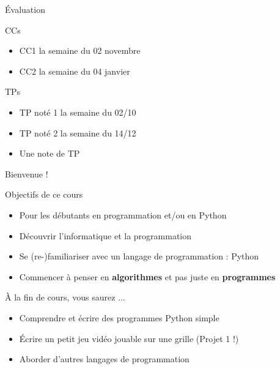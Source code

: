 \documentclass{beamer}
\begin{document}
\begin{frame}{Évaluation}

  \begin{block}{CCs}
    \begin{itemize}
    \item CC1 la semaine du 02 novembre 
    \item CC2 la semaine du 04 janvier 
    \end{itemize}
  \end{block}
  \begin{block}{TPs}
    \begin{itemize}
    \item TP noté 1 la semaine du 02/10
    \item TP noté 2 la semaine du 14/12
    \item Une note de TP
    \end{itemize}
  \end{block}


\end{frame}

\begin{frame}{Bienvenue !}
    \begin{block}{Objectifs de ce cours}
    \begin{itemize}
 		\item Pour les débutants en programmation et/ou en Python
        \item Découvrir l'informatique et la programmation
        \item Se (re-)familiariser avec un langage de programmation : Python
        \item Commencer à penser en \textbf{algorithmes} et pas juste en \textbf{programmes}
    \end{itemize}
    \end{block}
    \pause
    \vfill
    \begin{block}{À la fin de cours, vous saurez ...}
        \begin{itemize}
            \item Comprendre et écrire des programmes Python simple
            \item Écrire un petit jeu vidéo jouable sur une grille (Projet 1 !)
            \item Aborder d'autres langages de programmation
        \end{itemize}
    \end{block}
\end{frame}
\end{document}
